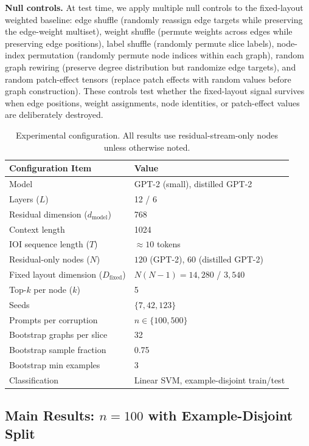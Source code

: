 \documentclass[11pt,a4paper]{article}
\begin{document}
\textbf{Null controls.} At test time, we apply multiple null controls to the fixed-layout weighted baseline: edge shuffle (randomly reassign edge targets while preserving the edge-weight multiset), weight shuffle (permute weights across edges while preserving edge positions), label shuffle (randomly permute slice labels), node-index permutation (randomly permute node indices within each graph), random graph rewiring (preserve degree distribution but randomize edge targets), and random patch-effect tensors (replace patch effects with random values before graph construction). These controls test whether the fixed-layout signal survives when edge positions, weight assignments, node identities, or patch-effect values are deliberately destroyed.

\begin{table}[H]
\centering
\small
\begin{tabular}{l@{\;}l}
\toprule
\textbf{Configuration Item} & \textbf{Value} \\
\midrule
Model & GPT-2 (small), distilled GPT-2 \\
Layers ($L$) & 12 / 6 \\
Residual dimension ($d_{\mathrm{model}}$) & 768 \\
Context length & 1024 \\
IOI sequence length ($T$) & $\approx 10$ tokens \\
Residual-only nodes ($N$) & $120$ (GPT-2), $60$ (distilled GPT-2) \\
Fixed layout dimension ($D_{\mathrm{fixed}}$) & $N(N-1) = 14,\!280$ / $3,\!540$ \\
Top-$k$ per node ($k$) & 5 \\
Seeds & $\{7, 42, 123\}$ \\
Prompts per corruption & $n \in \{100, 500\}$ \\
Bootstrap graphs per slice & 32 \\
Bootstrap sample fraction & 0.75 \\
Bootstrap min examples & 3 \\
Classification & Linear SVM, example-disjoint train/test \\
\bottomrule
\end{tabular}
\caption{Experimental configuration. All results use residual-stream-only nodes unless otherwise noted.}
\label{tab:config}
\end{table}

\subsection{Main Results: \texorpdfstring{$n=100$}{n=100} with Example-Disjoint Split}
\end{document}
